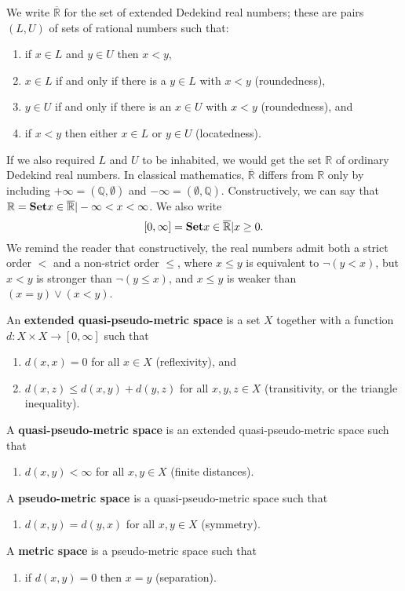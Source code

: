 \documentclass{article}
\def\R{\mathbb{R}}
\def\Re{\overline{\mathbb{R}}}
\def\Rp{[0,\infty]}
\begin{document}
We write $\Re$ for the set of extended Dedekind real numbers; these are pairs $(L,U)$ of sets of rational numbers such that:
\begin{enumerate}
\item if $x\in L$ and $y\in U$ then $x<y$,
\item $x\in L$ if and only if there is a $y\in L$ with $x<y$ (roundedness),
\item $y\in U$ if and only if there is an $x\in U$ with $x<y$ (roundedness), and
\item if $x<y$ then either $x\in L$ or $y\in U$ (locatedness).
\end{enumerate}
If we also required $L$ and $U$ to be inhabited, we would get the set $\R$ of ordinary Dedekind real numbers.
In classical mathematics, $\Re$ differs from $\R$ only by including $+\infty = (\mathbb{Q},\emptyset)$ and $-\infty = (\emptyset,\mathbb{Q})$.
Constructively, we can say that $\R = \setof{ x\in \Re | -\infty < x < \infty }$.
We also write
\[\Rp = \setof{x\in\Re | x\ge 0 }.\]
We remind the reader that constructively, the real numbers admit both a strict order $<$ and a non-strict order $\le$, where $x\le y$ is equivalent to $\neg(y<x)$, but $x<y$ is stronger than $\neg(y\le x)$, and $x\le y$ is weaker than $(x=y)\lor (x<y)$.

\begin{defn}
  An \textbf{extended quasi-pseudo-metric space} is a set $X$ together with a function $d:X\times X \to \Rp$ such that
  \begin{enumerate}
  \item $d(x,x)=0$ for all $x\in X$ (reflexivity), and
  \item $d(x,z)\le d(x,y)+d(y,z)$ for all $x,y,z\in X$ (transitivity, or the triangle inequality).
  \end{enumerate}
  A \textbf{quasi-pseudo-metric space} is an extended quasi-pseudo-metric space such that
  \begin{enumerate}[resume]
  \item $d(x,y)<\infty$ for all $x,y\in X$ (finite distances).
  \end{enumerate}
  A \textbf{pseudo-metric space} is a quasi-pseudo-metric space such that
  \begin{enumerate}[resume]
  \item $d(x,y)=d(y,x)$ for all $x,y\in X$ (symmetry).
  \end{enumerate}
  A \textbf{metric space} is a pseudo-metric space such that
  \begin{enumerate}[resume]
  \item if $d(x,y)=0$ then $x=y$ (separation).
  \end{enumerate}
\end{defn}
\end{document}
